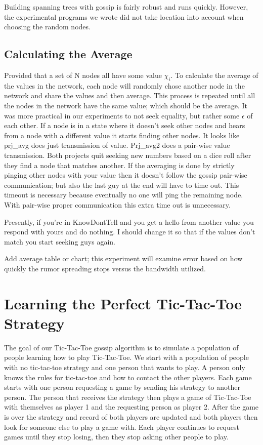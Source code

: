 \documentclass[11pt,twocolumn]{article}
\begin{document}
Building spanning trees with gossip is fairly robust and runs quickly.  However, the experimental programs we wrote did not take location into account when choosing the random nodes.

\subsection{Calculating the Average}

Provided that a set of N nodes all have some value $\chi_i$.  To calculate the average of the values in the network, each node will randomly chose another node in the network and share the values and then average.  This process is repeated until all the nodes in the network have the same value; which should be the average.  It was more practical in our experiments to not seek equality, but rather some $\epsilon$ of each other.  If a node is in a state where it doesn't seek other nodes and hears from a node with a different value it starts finding other nodes.  It looks like prj\_avg does just transmission of value.  Prj\_avg2 does a pair-wise value transmission.  Both projects quit seeking new numbers based on a dice roll after they find a node that matches another.  If the averaging is done by strictly pinging other nodes with your value then it doesn't follow the gossip pair-wise communication; but also the last guy at the end will have to time out.  This timeout is necessary because eventually no one will ping the remaining node.  With pair-wise proper communication this extra time out is unnecessary.

Presently, if you're in KnowDontTell and you get a hello from another value you respond with yours and do nothing.  I should change it so that if the values don't match you start seeking guys again.

Add average table or chart; this experiment will examine error based on how quickly the rumor spreading stops versus the bandwidth utilized.

\section{Learning the Perfect Tic-Tac-Toe Strategy}

The goal of our Tic-Tac-Toe gossip algorithm is to simulate a population of people learning how to play Tic-Tac-Toe.  We start with a population of people with no tic-tac-toe strategy and one person that wants to play.  A person only knows the rules for tic-tac-toe and how to contact the other players.  Each game starts with one person requesting a game by sending his strategy to another person.  The person that receives the strategy then plays a game of Tic-Tac-Toe with themselves as player 1 and the requesting person as player 2.  After the game is over the strategy and record of both players are updated and both players then look for someone else to play a game with.  Each player continues to request games until they stop losing, then they stop asking other people to play.
\end{document}
